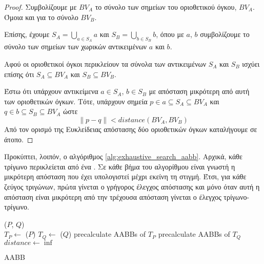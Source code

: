 \begin{proof}
    Συμβολίζουμε με $BV_A$ το σύνολο των σημείων του 
    οριοθετικού όγκου, $BV_A$. 
    Όμοια και για το σύνολο $BV_B$.

    Επίσης, έχουμε
    $S_A = \bigcup\limits_{a \in S_A} a $ και $S_B = \bigcup\limits_{b \in S_B} b$,
    όπου με $a$, $b$ συμβολίζουμε το σύνολο των σημείων των 
    χωρικών αντικειμένων $a$ και $b$.

    Αφού οι οριοθετικοί όγκοι περικλείουν τα σύνολα των 
    αντικειμένων $S_A$ και $S_B$ ισχύει επίσης ότι 
    $S_A \subseteq BV_A $ και 
    $S_B \subseteq BV_B $.

    Έστω ότι υπάρχουν αντικείμενα $a \in S_A$, $b \in S_B$ με απόσταση μικρότερη 
    από αυτή των οριοθετικών όγκων. Τότε, υπάρχουν σημεία $p \in a \subseteq S_A 
    \subseteq BV_A$ και $q \in b \subseteq S_B \subseteq BV_A$ ώστε 
    \[\lVert p - q \rVert < distance(BV_A, BV_B)\]
    Από τον ορισμό της Ευκλείδειας απόστασης δύο οριοθετικών όγκων καταλήγουμε 
    σε άτοπο.
\end{proof}

Προκύπτει, λοιπόν, ο αλγόριθμος \ref{alg:exhaustive_search_aabb}.
Αρχικά, κάθε τρίγωνο περικλείεται από 
ένα . Σε κάθε βήμα του αλγορίθμου είναι γνωστή η μικρότερη απόσταση 
που έχει υπολογιστεί μέχρι εκείνη τη στιγμή. Έτσι, για κάθε ζεύγος τριγώνων, 
πρώτα γίνεται ο γρήγορος έλεγχος απόστασης  και μόνο όταν αυτή 
η απόσταση είναι μικρότερη από την τρέχουσα απόσταση γίνεται ο έλεγχος 
τρίγωνο-τρίγωνο.

\IncMargin{1.5em}
\begin{algorithm}[h]
    \DontPrintSemicolon
    \Indm\nonl\funcname($P$, $Q$)\\
    \Indp
        $T_P \gets$ \trias($P$) \;
        $T_Q \gets$ \trias($Q$) \;
        precalculate AABBs of $T_P$\;
        precalculate AABBs of $T_Q$\; 
        $distance \gets \inf$ \;

    \caption[...]{
         AABB
    }
    \label{alg:exhaustive_search_aabb}
\end{algorithm}
\DecMargin{1.5em}

